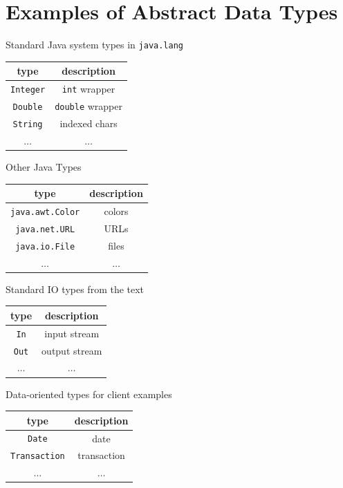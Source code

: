 \documentclass[8pt,a4paper,compress]{beamer}
\begin{document}
\section{Examples of Abstract Data Types}
\begin{frame}[fragile]
Standard Java system types in \lstinline{java.lang}
\begin{center}
\begin{tabular}{cc}
type & description \\ \hline
\lstinline$Integer$ & \lstinline$int$ wrapper \\
\lstinline$Double$ & \lstinline$double$ wrapper \\
\lstinline$String$ & indexed chars \\
$\dots$ & $\dots$
\end{tabular} 
\end{center}

Other Java Types
\begin{center}
\begin{tabular}{cc}
type & description \\ \hline
\lstinline$java.awt.Color$ & colors \\
\lstinline$java.net.URL$ & URLs \\
\lstinline$java.io.File$ & files \\
$\dots$ & $\dots$
\end{tabular} 
\end{center}

Standard IO types from the text
\begin{center}
\begin{tabular}{cc}
type & description \\ \hline
\lstinline$In$  & input stream \\
\lstinline$Out$ & output stream \\
$\dots$ & $\dots$
\end{tabular} 
\end{center}

Data-oriented types for client examples
\begin{center}
\begin{tabular}{cc}
type & description \\ \hline
\lstinline$Date$ & date \\
\lstinline$Transaction$ & transaction \\
$\dots$ & $\dots$
\end{tabular} 
\end{center}
\end{frame}
\end{document}
